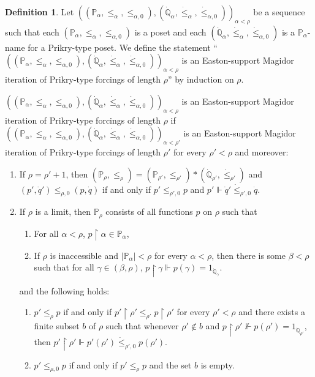\documentclass[a4paper]{amsart}
\theoremstyle{definition}
\newtheorem{mydef}{Definition}[section]
\theoremstyle{remark}
\theoremstyle{plain}
\numberwithin{mydef}{section}
\newcommand{\dP}{\mathbb{P}}
\newcommand{\dQ}{\mathbb{Q}}
\newcommand{\uhr}{\upharpoonright}
\begin{document}
	\begin{mydef}
		Let $((\dP_{\alpha},\leq_{\alpha},\leq_{\alpha,0}),(\dot{\dQ}_{\alpha},\dot{\leq}_{\alpha},\dot{\leq}_{\alpha,0}))_{\alpha<\rho}$ be a sequence such that each $(\dP_{\alpha},\leq_{\alpha},\leq_{\alpha,0})$ is a poset and each $(\dot{\dQ}_{\alpha},\dot{\leq}_{\alpha},\dot{\leq}_{\alpha,0})$ is a $\dP_{\alpha}$-name for a Prikry-type poset. We define the statement ``$((\dP_{\alpha},\leq_{\alpha},\leq_{\alpha,0}),(\dot{\dQ}_{\alpha},\dot{\leq}_{\alpha},\dot{\leq}_{\alpha,0}))_{\alpha<\rho}$ is an Easton-support Magidor iteration of Prikry-type forcings of length $\rho$'' by induction on $\rho$.
		
		$((\dP_{\alpha},\leq_{\alpha},\leq_{\alpha,0}),(\dot{\dQ}_{\alpha},\dot{\leq}_{\alpha},\dot{\leq}_{\alpha,0}))_{\alpha<\rho}$ is an Easton-support Magidor iteration of Prikry-type forcings of length $\rho$ if $((\dP_{\alpha},\leq_{\alpha},\leq_{\alpha,0}),(\dot{\dQ}_{\alpha},\dot{\leq}_{\alpha},\dot{\leq}_{\alpha,0}))_{\alpha<\rho'}$ is an Easton-support Magidor iteration of Prikry-type forcings of length $\rho'$ for every $\rho'<\rho$ and moreover:
		\begin{enumerate}
			\item If $\rho=\rho'+1$, then $(\dP_{\rho},\leq_{\rho})=(\dP_{\rho'},\leq_{\rho'})*(\dot{\dQ}_{\rho'},\dot{\leq}_{\rho'})$ and $(p',\dot{q}')\leq_{\rho,0}(p,\dot{q})$ if and only if $p'\leq_{\rho',0}p$ and $p'\Vdash\dot{q}'\dot{\leq}_{\rho',0}\dot{q}$.
			\item If $\rho$ is a limit, then $\dP_{\rho}$ consists of all functions $p$ on $\rho$ such that
			\begin{enumerate}
				\item For all $\alpha<\rho$, $p\uhr\alpha\in\dP_{\alpha}$,
				\item If $\rho$ is inaccessible and $|\dP_{\alpha}|<\rho$ for every $\alpha<\rho$, then there is some $\beta<\rho$ such that for all $\gamma\in(\beta,\rho)$, $p\uhr\gamma\Vdash p(\gamma)=1_{\dot{\dQ}_{\gamma}}$.
			\end{enumerate}
			and the following holds:
			\begin{enumerate}
				\item[(i)] $p'\leq_{\rho}p$ if and only if $p'\uhr\rho'\leq_{\rho'}p\uhr\rho'$ for every $\rho'<\rho$ and there exists a finite subset $b$ of $\rho$ such that whenever $\rho'\notin b$ and $p\uhr\rho'\not\Vdash p(\rho')=1_{\dot{\dQ}_{\rho'}}$, then $p'\uhr\rho'\Vdash p'(\rho')\dot{\leq}_{\rho',0} p(\rho')$.
				\item[(ii)] $p'\leq_{\rho,0}p$ if and only if $p'\leq_{\rho}p$ and the set $b$ is empty.
			\end{enumerate} 
		\end{enumerate}
	\end{mydef}
	
\end{document}
